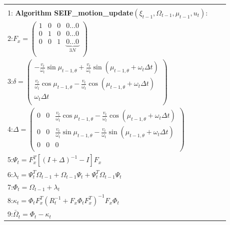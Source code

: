 \documentclass[10pt,a4paper]{article}
\begin{document}
\begin{table}[H]
\begin{center}
\begin{tabular}{|l|}
\hline
{}\\
1:\textbf{ Algorithm SEIF\_motion\_update}$(\xi_{t-1},\varOmega_{t-1},\mu_{t-1},u_t):\qquad$\\
2:\hspace{5mm}$F_x=\left(\begin{array}{cccc}1&0&0&0...0\\
0&1&0&0...0\\
0&0&1&\underbrace{0...0}_{3N}\\
\end{array} \right)$\\
3:\hspace{5mm}$\delta=\left(\begin{array}{c}
-\frac{v_t}{\omega_t}\sin\mu_{t-1,\theta}+\frac{v_t}{\omega_t}\sin(\mu_{t-1,\theta}+\omega_t\varDelta t)\\
\frac{v_t}{\omega_t}\cos\mu_{t-1,\theta}-\frac{v_t}{\omega_t}\cos(\mu_{t-1,\theta}+\omega_t\varDelta t)\\
\omega_t\varDelta t\\
\end{array} \right)$\\
4:\hspace{5mm}$\varDelta=\left(\begin{array}{ccc}
0&0&\frac{v_t}{\omega_t}\cos\mu_{t-1,\theta}-\frac{v_t}{\omega_t}\cos(\mu_{t-1,\theta}+\omega_t\varDelta t)\\
0&0&\frac{v_t}{\omega_t}\sin\mu_{t-1,\theta}-\frac{v_t}{\omega_t}\sin(\mu_{t-1,\theta}+\omega_t\varDelta t)\\
0&0&0\\
\end{array} \right)$\\
5:\hspace{5mm}$\varPsi_t=F_x^T[(I+\varDelta)^{-1}-I]F_x$\\
6:\hspace{5mm}$\lambda_t=\varPsi_t^T\varOmega_{t-1}+\varOmega_{t-1}\varPsi_t+\varPsi_t^T\varOmega_{t-1}\varPsi_t$\\
7:\hspace{5mm}$\varPhi_t=\varOmega_{t-1}+\lambda_t$\\
8:\hspace{5mm}$\kappa_t=\varPhi_tF_x^T(R_t^{-1}+F_x\varPhi_tF_x^T)^{-1}F_x\varPhi_t$\\
9:\hspace{5mm}$\bar{\varOmega}_t=\varPhi_t-\kappa_t$\\

\end{tabular}
\end{center}
\end{table}
\end{document}

